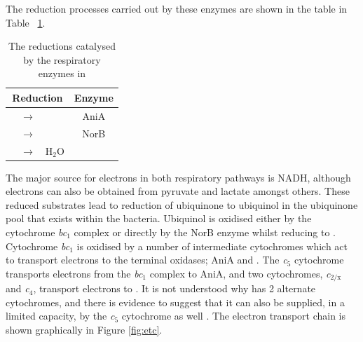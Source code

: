 The reduction processes carried out by these enzymes are shown in the table in Table ~{\ref{tab:reduction-enzymes}}.

\begin{table}[tbp]
\begin{center}
\begin{tabular}{lclc}
\toprule
\multicolumn{3}{c}{\textbf{Reduction}}& \textbf{Enzyme} \\
\midrule
\cNitrite{} & $\rightarrow$ & \cNO{} & AniA \\
\cNO{} & $\rightarrow$ & \cNtwoO{} & NorB \\
\cOxygen{} & $\rightarrow$ & H$_{\textrm{2}}$O & \cbbthree{} \\
\bottomrule
\end{tabular} 
\end{center}
\caption{The reductions catalysed by the respiratory enzymes in \Nm{}
\label{tab:reduction-enzymes}}
\end{table}

The major source for electrons in both respiratory pathways is NADH, although electrons can also be obtained from pyruvate and lactate amongst others. These reduced substrates lead to reduction of ubiquinone to ubiquinol in the ubiquinone pool that exists within the bacteria. Ubiquinol is oxidised either by the cytochrome \textit{bc$_{\textrm{1}}$} complex or directly by the NorB enzyme whilst reducing \cNO{} to \cNtwoO{}. Cytochrome \textit{bc$_{\textrm{1}}$} is oxidised by a number of intermediate cytochromes which act to transport electrons to the terminal oxidases; AniA and \cbbthree{}. The \textit{c$_{\textrm{5}}$} cytochrome transports electrons from the \textit{bc$_{\textrm{1}}$} complex to AniA, and two cytochromes, \textit{c$_{\textrm{2/x}}$} and \textit{c$_{\textrm{4}}$}, transport electrons to \cbbthree{}. It is not understood why \cbbthree{} has 2 alternate cytochromes, and there is evidence to suggest that it can also be supplied, in a limited capacity, by the \textit{c$_{\textrm{5}}$} cytochrome as well \cite{Deeudom2008}. The electron transport chain is shown graphically in Figure \ref{fig:etc}.

